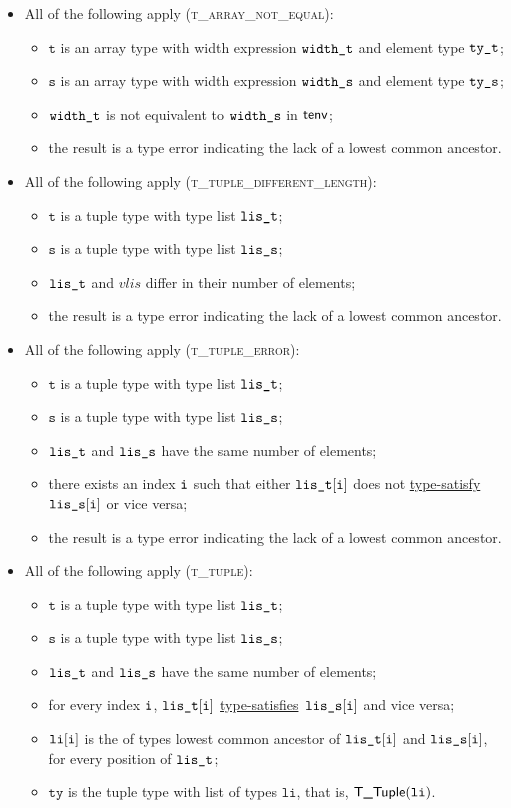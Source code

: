 \documentclass{book}
\newcommand\typesatisfies[0]{\hyperlink{def-typesatisfies}{type-satisfies}}
\newcommand\typesatisfy[0]{\hyperlink{def-typesatisfies}{type-satisfy}}
\newcommand\vt[0]{\texttt{t}}
\newcommand\vs[0]{\texttt{s}}
\newcommand\tty[0]{\texttt{ty}}
\newcommand\vli[0]{\texttt{li}}
\begin{document}
\begin{itemize}
\begin{itemize}
    \item All of the following apply (\textsc{t\_array\_not\_equal}):
    \begin{itemize}
      \item $\vt$ is an array type with width expression $\texttt{width\_t}$ and element type $\texttt{ty\_t}$;
      \item $\vs$ is an array type with width expression $\texttt{width\_s}$ and element type $\texttt{ty\_s}$;
      \item $\texttt{width\_t}$ is not equivalent to $\texttt{width\_s}$ in $\textsf{tenv}$;
      \item the result is a type error indicating the lack of a lowest common ancestor.
    \end{itemize}

    \item All of the following apply (\textsc{t\_tuple\_different\_length}):
    \begin{itemize}
      \item $\vt$ is a tuple type with type list $\texttt{lis\_t}$;
      \item $\vs$ is a tuple type with type list $\texttt{lis\_s}$;
      \item $\texttt{lis\_t}$ and $vlis$ differ in their number of elements;
      \item the result is a type error indicating the lack of a lowest common ancestor.
    \end{itemize}

    \item All of the following apply (\textsc{t\_tuple\_error}):
    \begin{itemize}
      \item $\vt$ is a tuple type with type list $\texttt{lis\_t}$;
      \item $\vs$ is a tuple type with type list $\texttt{lis\_s}$;
      \item $\texttt{lis\_t}$ and $\texttt{lis\_s}$ have the same number of elements;
      \item there exists an index $\texttt{i}$ such that either $\texttt{lis\_t}[\texttt{i}]$ does not \typesatisfy\ $\texttt{lis\_s}[\texttt{i}]$ or vice versa;
      \item the result is a type error indicating the lack of a lowest common ancestor.
    \end{itemize}

    \item All of the following apply (\textsc{t\_tuple}):
    \begin{itemize}
      \item $\vt$ is a tuple type with type list $\texttt{lis\_t}$;
      \item $\vs$ is a tuple type with type list $\texttt{lis\_s}$;
      \item $\texttt{lis\_t}$ and $\texttt{lis\_s}$ have the same number of elements;
      \item for every index $\texttt{i}$, $\texttt{lis\_t}[\texttt{i}]$ \typesatisfies\ $\texttt{lis\_s}[\texttt{i}]$ and vice versa;
      \item $\vli[\vi]$ is the of types lowest common ancestor of $\texttt{lis\_t}[\texttt{i}]$ and $\texttt{lis\_s}[\texttt{i}]$, for every position of $\texttt{lis\_t}$;
      \item $\tty$ is the tuple type with list of types $\vli$, that is, $\TTuple(\vli)$.
    \end{itemize}


\end{itemize}
\end{itemize}
\end{document}
